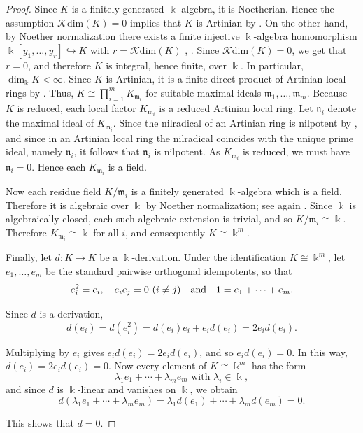\documentclass{amsart}
\theoremstyle{definition}
\theoremstyle{remark}
\numberwithin{equation}{section}
\begin{document}
\begin{proof}
Since $K$ is a finitely generated $\Bbbk$-algebra, it is Noetherian. Hence the assumption $\mathcal{K}\mathrm{dim}(K) = 0$ implies that $K$ is Artinian by \cite[Theorem 8.5]{AtiyahMacdonald1969}. On the other hand, by Noether normalization there exists a finite injective $\Bbbk$-algebra homomorphism $\Bbbk[y_1,\ldots,y_r]\hookrightarrow K$ with $r=\mathcal{K}\mathrm{dim}(K)$ \cite[Theorem 13.3]{Eisenbud1995}, \cite[Corollary 14.3]{Matsumura1986}. Since $\mathcal{K}\mathrm{dim}(K)=0$, we get that $r=0$, and therefore $K$ is integral, hence finite, over $\Bbbk$. In particular, $\dim_{\Bbbk}K<\infty$. Since $K$ is Artinian, it is a finite direct product of Artinian local rings by \cite[Theorem 8.7]{AtiyahMacdonald1969}. Thus, $K\cong \prod_{i=1}^m K_{\mathfrak m_i}$ for suitable maximal ideals $\mathfrak m_1,\ldots,\mathfrak m_m$. Because $K$ is reduced, each local factor $K_{\mathfrak m_i}$ is a reduced Artinian local ring. Let $\mathfrak n_i$ denote the maximal ideal of $K_{\mathfrak m_i}$. Since the nilradical of an Artinian ring is nilpotent by \cite[Proposition 8.4]{AtiyahMacdonald1969}, and since in an Artinian local ring the nilradical coincides with the unique prime ideal, namely $\mathfrak n_i$, it follows that $\mathfrak n_i$ is nilpotent. As $K_{\mathfrak m_i}$ is reduced, we must have $\mathfrak n_i=0$. Hence each $K_{\mathfrak m_i}$ is a field.

Now each residue field $K/\mathfrak m_i$ is a finitely generated $\Bbbk$-algebra which is a field. Therefore it is algebraic over $\Bbbk$ by Noether normalization; see again \cite[Corollary 14.3]{Matsumura1986}. Since $\Bbbk$ is algebraically closed, each such algebraic extension is trivial, and so $K/\mathfrak m_i\cong \Bbbk$. Therefore $K_{\mathfrak m_i}\cong \Bbbk$ for all $i$, and consequently $K\cong \Bbbk^m$.

Finally, let $d:K\to K$ be a $\Bbbk$-derivation. Under the identification $K\cong \Bbbk^m$, let $e_1,\ldots,e_m$ be the standard pairwise orthogonal idempotents, so that
\[
e_i^2 = e_i, \quad e_ie_j = 0\ (i\neq j) \quad {\rm and} \quad 1 = e_1+\cdots+e_m.
\]

Since $d$ is a derivation,
\[
d(e_i)=d(e_i^2)=d(e_i)e_i+e_i d(e_i)=2e_i d(e_i).
\]

Multiplying by $e_i$ gives $e_i d(e_i)=2e_i d(e_i)$, and so $e_i d(e_i)=0$. In this way, $d(e_i)=2e_i d(e_i) = 0$. Now every element of $K\cong \Bbbk^m$ has the form
\[
\lambda_1 e_1+\cdots+\lambda_m e_m \text{ with } \lambda_i\in\Bbbk,
\]
and since $d$ is $\Bbbk$-linear and vanishes on $\Bbbk$, we obtain
\[
d(\lambda_1 e_1+\cdots+\lambda_m e_m) = \lambda_1 d(e_1)+\cdots+\lambda_m d(e_m)=0.
\]

This shows that $d=0$. 
\end{proof}
\end{document}
